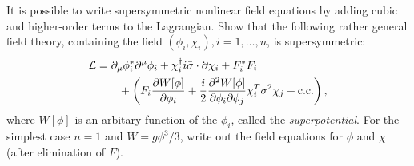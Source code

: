 \begin{problembody}
    \item It is possible to write supersymmetric nonlinear field equations by adding cubic and higher-order terms to the Lagrangian. Show that the following rather 
    general field theory, containing the field $(\phi_i, \chi_i), i = 1, \dots, n$, is supersymmetric:
    \begin{align}\label{equ:cp3:susy_lag_g}
        \mathcal{L} & = \partial_\mu\phi_i^\ast\partial^\mu\phi_i
            + \chi_i^\dagger i\bar{\sigma}\cdot\partial\chi_i + F_i^\ast F_i\nonumber\\
            & \qquad + \left(
                F_i\frac{\partial W[\phi]}{\partial \phi_i} 
                + \frac{i}{2}\frac{\partial^2 W[\phi]}{\partial \phi_i\partial \phi_j}\chi_i^T\sigma^2\chi_j
                + \mathrm{c.c.}
            \right),
    \end{align}
    where $W[\phi]$ is an arbitary function of the $\phi_i$, called the \textit{superpotential}. For the simplest case $n = 1$ and $W = g\phi^3 / 3$, write out the field 
    equations for $\phi$ and $\chi$ (after elimination of $F$).
\end{problembody}

